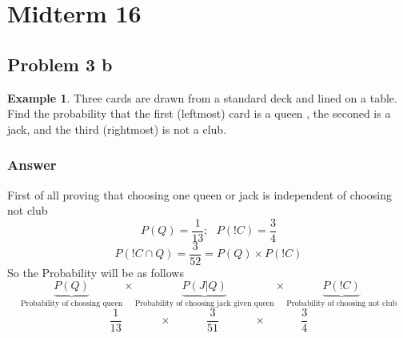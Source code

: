 \documentclass[12pt]{article}
\theoremstyle{definition}
\newtheorem{exmp}{Example}[section]
\begin{document}
\section{Midterm 16}
\subsection{Problem 3 b}
\begin{exmp}
    Three cards are drawn from a standard deck and lined on a table.
    Find the probability that the first (leftmost) card is a queen
    , the seconed is a jack, and the third (rightmost) is not a club.
    \subsubsection{Answer}
    First of all proving that choosing one queen or jack is independent of
    choosing not club 
    \[
        P(Q) = \frac{1}{13}; \ \ \ P(!C) = \frac{3}{4}
    \]
    \[
        P(!C \cap Q) = \frac{3}{52} = P(Q) \times P(!C)
    \]
So the Probability will be as follows 
\[
    \underbrace{P(Q)}_{\text{Probability of choosing queen}} 
    \times \underbrace{P(J|Q)}_{\text{Probability of choosing jack given queen}}
    \times \underbrace{P(!C)}_{\text{Probability of choosing not club}}
\]
\[
    \frac{1}{13}\   \ \ \ \ \  \ \ \ \ \ \ \ \ \ \times \ \ \ \ \ \ \ \ \ \  \ \ \ \
    \frac{3}{51} \ \ \ \ \ \ \ \ \ \  \ \ \ \ \times  \ \ \ \ \ \ \ \ \ \  \ \ \ \ \frac{3}{4}
\]
    
\end{exmp}
\end{document}
